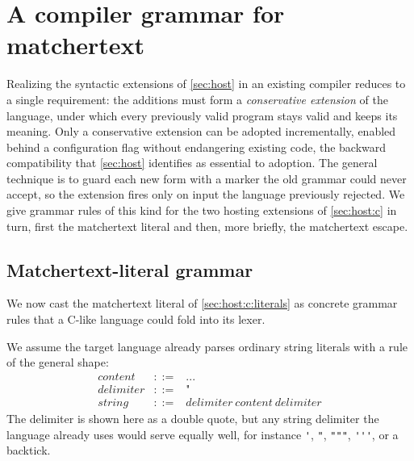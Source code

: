 \section{A compiler grammar for matchertext}
\label{app:grammar}

Realizing the syntactic extensions of \cref{sec:host} in an existing compiler
reduces to a single requirement:
the additions must form a \emph{conservative extension} of the language,
under which every previously valid program stays valid and keeps its meaning.
Only a conservative extension can be adopted incrementally,
enabled behind a configuration flag without endangering existing code,
the backward compatibility that \cref{sec:host} identifies as essential to adoption.
The general technique is to guard each new form
with a marker the old grammar could never accept,
so the extension fires only on input the language previously rejected.
We give grammar rules of this kind for the two hosting extensions
of \cref{sec:host:c} in turn,
first the matchertext literal and then, more briefly, the matchertext escape.

\subsection{Matchertext-literal grammar}
\label{app:grammar:literal}

We now cast the matchertext literal of \cref{sec:host:c:literals}
as concrete grammar rules that a C-like language could fold into its lexer.

We assume the target language already parses ordinary string literals
with a rule of the general shape:
\[
\begin{array}{rcl}
\mathit{content}
  & ::= & \texttt{...} \\

\mathit{delimiter}
  & ::= & \texttt{"} \\

\mathit{string}
  & ::= & \mathit{delimiter}\ \mathit{content}\ \mathit{delimiter}
\end{array}
\]
The delimiter is shown here as a double quote,
but any string delimiter the language already uses would serve equally well,
for instance \verb|'|, \verb|"|, \verb|"""|, \verb|'''|, or a backtick.

